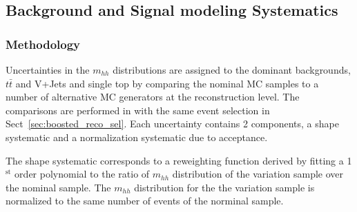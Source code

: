 \FloatBarrier
 
\subsection{Background and Signal modeling Systematics}
\label{sec:boosted_syst_modeling}
 
 
\subsubsection{Methodology}
\label{sec:boosted_syst_modeling_method}
 
Uncertainties in the $m_{hh}$ distributions are assigned to the dominant backgrounds, $t\bar{t}$ and V+Jets and
single top by comparing the nominal MC samples to a number of alternative MC generators at the reconstruction
level. The comparisons are performed in with the same event selection in Sect~\ref{sec:boosted_reco_sel}.
Each uncertainty contains 2 components, a shape systematic and a normalization systematic due to acceptance.
 
The shape systematic corresponds to a reweighting function derived by fitting a 1$^\text{st}$ order polynomial to the
ratio of $m_{hh}$ distribution of the variation sample over the nominal sample. The $m_{hh}$ distribution for the
the variation sample is normalized to the same number of events of the norminal sample.
 
 
 
 
